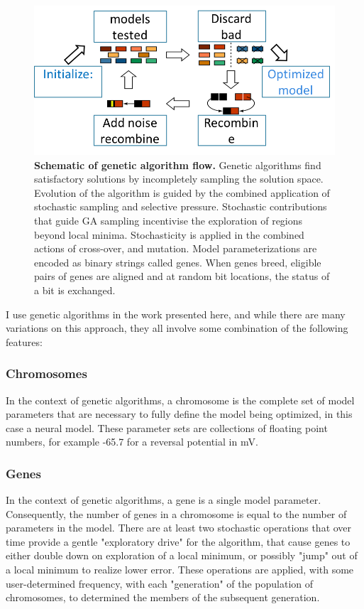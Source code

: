 \begin{figure}
\begin{center}

    \includegraphics[width=0.7\linewidth]{figures/How_Genetic_Alg_Works.png}
  \caption{\textbf{Schematic of genetic algorithm flow.} Genetic algorithms find satisfactory solutions by incompletely sampling the solution space. Evolution of the algorithm is guided by the combined application of stochastic sampling and selective pressure. Stochastic contributions that guide GA sampling incentivise the exploration of regions beyond local minima. Stochasticity is applied in the combined actions of cross-over, and mutation. Model parameterizations are encoded as binary strings called genes. When genes breed, eligible pairs of genes are aligned and at random bit locations, the status of a bit is exchanged.  
}
  \label{fig:GeneticAlgOver}
\end{center}

\end{figure}
  

I use genetic algorithms in the work presented here, and while there are many variations on this approach, they all involve some combination of the following features:
\subsubsection{Chromosomes}
In the context of genetic algorithms, a chromosome is the complete set of model parameters that are necessary to fully define the model being optimized, in this case a neural model.
These parameter sets are collections of floating point numbers, for example -65.7 for a reversal potential in mV.
\subsubsection{Genes}
In the context of genetic algorithms, a gene is a single model parameter.  Consequently, the number of genes in a chromosome is equal to the number of parameters in the model.
There are at least two stochastic operations that over time provide a gentle "exploratory drive" for the algorithm, that cause genes to either double down on exploration of a local minimum, or possibly "jump" out of a local minimum to realize lower error.  These operations are applied, with some user-determined frequency, with each "generation" of the population of chromosomes, to determined the members of the subsequent generation.
